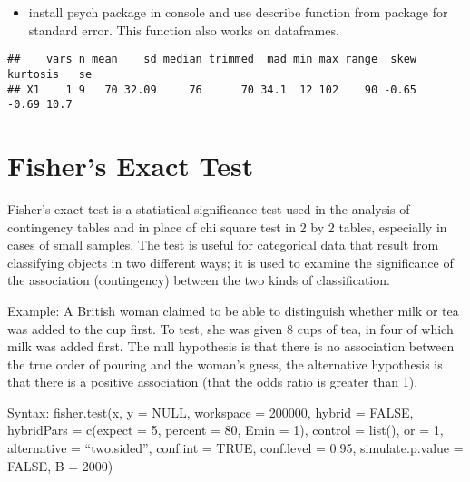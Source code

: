 \documentclass[
]{article}
\newenvironment{Shaded}{\begin{snugshade}}{\end{snugshade}}
\newcommand{\DataTypeTok}[1]{\textcolor[rgb]{0.13,0.29,0.53}{#1}}
\newcommand{\DecValTok}[1]{\textcolor[rgb]{0.00,0.00,0.81}{#1}}
\newcommand{\KeywordTok}[1]{\textcolor[rgb]{0.13,0.29,0.53}{\textbf{#1}}}
\newcommand{\NormalTok}[1]{#1}
\newcommand{\OperatorTok}[1]{\textcolor[rgb]{0.81,0.36,0.00}{\textbf{#1}}}
\providecommand{\tightlist}{%
  \setlength{\itemsep}{0pt}\setlength{\parskip}{0pt}}
\begin{document}
\begin{itemize}
\tightlist
\item
  install psych package in console and use describe function from
  package for standard error. This function also works on dataframes.
\end{itemize}

\begin{Shaded}
\end{Shaded}

\begin{verbatim}
##    vars n mean    sd median trimmed  mad min max range  skew kurtosis   se
## X1    1 9   70 32.09     76      70 34.1  12 102    90 -0.65    -0.69 10.7
\end{verbatim}

\hypertarget{fishers-exact-test}{%
\section{Fisher's Exact Test}\label{fishers-exact-test}}

Fisher's exact test is a statistical significance test used in the
analysis of contingency tables and in place of chi square test in 2 by 2
tables, especially in cases of small samples. The test is useful for
categorical data that result from classifying objects in two different
ways; it is used to examine the significance of the association
(contingency) between the two kinds of classification.

Example: A British woman claimed to be able to distinguish whether milk
or tea was added to the cup first. To test, she was given 8 cups of tea,
in four of which milk was added first. The null hypothesis is that there
is no association between the true order of pouring and the woman's
guess, the alternative hypothesis is that there is a positive
association (that the odds ratio is greater than 1).

Syntax: fisher.test(x, y = NULL, workspace = 200000, hybrid = FALSE,
hybridPars = c(expect = 5, percent = 80, Emin = 1), control = list(), or
= 1, alternative = ``two.sided'', conf.int = TRUE, conf.level = 0.95,
simulate.p.value = FALSE, B = 2000)
\end{document}
